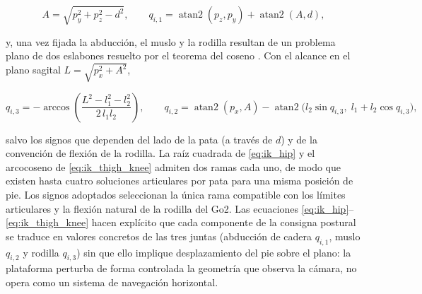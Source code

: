 \documentclass[12pt,a4paper]{report}
\begin{document}
\begin{equation}
A = \sqrt{p_y^2 + p_z^2 - d^2},
\qquad
q_{i,1} = \operatorname{atan2}(p_z, p_y) + \operatorname{atan2}(A, d),
\label{eq:ik_hip}
\end{equation}

y, una vez fijada la abducción, el muslo y la rodilla resultan de un problema
plano de dos eslabones resuelto por el teorema del coseno
\citep{Siciliano2009,CHAMP}. Con el alcance en el plano sagital
\(L = \sqrt{p_x^2 + A^2}\),

\begin{equation}
q_{i,3} = -\arccos\!\left(\frac{L^2 - l_1^2 - l_2^2}{2\,l_1 l_2}\right),
\qquad
q_{i,2} = \operatorname{atan2}(p_x, A) -
\operatorname{atan2}\!\big(l_2 \sin q_{i,3},\; l_1 + l_2 \cos q_{i,3}\big),
\label{eq:ik_thigh_knee}
\end{equation}

salvo los signos que dependen del lado de la pata (a través de \(d\)) y de la
convención de flexión de la rodilla. La raíz cuadrada de \eqref{eq:ik_hip} y el
arcocoseno de \eqref{eq:ik_thigh_knee} admiten dos ramas cada uno, de modo que
existen hasta cuatro soluciones articulares por pata para una misma posición de
pie. Los signos adoptados seleccionan la única rama compatible con los límites
articulares y la flexión natural de la rodilla del Go2. Las ecuaciones
\eqref{eq:ik_hip}--\eqref{eq:ik_thigh_knee} hacen explícito que cada componente
de la consigna postural se traduce en valores concretos de las tres juntas
(abducción de cadera \(q_{i,1}\), muslo \(q_{i,2}\) y rodilla \(q_{i,3}\)) sin que
ello implique desplazamiento del pie sobre el plano: la plataforma perturba de
forma controlada la geometría que observa la cámara, no opera como un sistema de
navegación horizontal.
\end{document}

